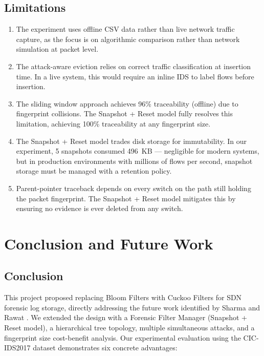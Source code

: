 \documentclass[12pt, a4paper]{report}
\begin{document}
\section{Limitations}

\begin{enumerate}[leftmargin=*]
  \item The experiment uses offline CSV data rather than live network
  traffic capture, as the focus is on algorithmic comparison rather than
  network simulation at packet level.

  \item The attack-aware eviction relies on correct traffic
  classification at insertion time. In a live system, this would require
  an inline IDS to label flows before insertion.

  \item The sliding window approach achieves 96\% traceability (offline)
  due to fingerprint collisions. The Snapshot + Reset model fully
  resolves this limitation, achieving 100\% traceability at any
  fingerprint size.

  \item The Snapshot + Reset model trades disk storage for immutability.
  In our experiment, 5 snapshots consumed 496~KB --- negligible for
  modern systems, but in production environments with millions of flows
  per second, snapshot storage must be managed with a retention policy.

  \item Parent-pointer traceback depends on every switch on the path
  still holding the packet fingerprint. The Snapshot + Reset model
  mitigates this by ensuring no evidence is ever deleted from any switch.
\end{enumerate}

\chapter{Conclusion and Future Work}

\section{Conclusion}

This project proposed replacing Bloom Filters with Cuckoo Filters for
SDN forensic log storage, directly addressing the future work identified
by Sharma and Rawat \cite{sharma2023}. We extended the design with a
Forensic Filter Manager (Snapshot + Reset model), a hierarchical tree
topology, multiple simultaneous attacks, and a fingerprint size
cost-benefit analysis. Our experimental evaluation using the CIC-IDS2017
dataset demonstrates six concrete advantages:
\end{document}
